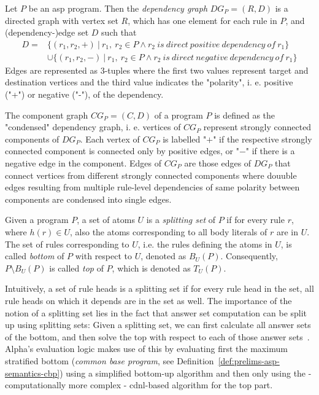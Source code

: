 \begin{definition}
\label{def:prelims-asp-semantics-depgraph}
Let $P$ be an \gls{asp} program. Then the \emph{dependency graph}  $\mathit{DG}_P = (R, D)$ is a directed graph with vertex set $R$, which has one element for each rule in $P$, and (dependency-)edge set $D$ such that
\begin{align*}
	D = &\{ (r_1, r_2, +)\ |\ r_1,\ r_2 \in P \land r_2\ \mathit{is\ direct\ positive\ dependency\ of}\ r_1 \}\\ &\cup
\{ (r_1, r_2, -)\ |\ r_1,\ r_2 \in P \land r_2\ \mathit{is\ direct\ negative\ dependency\ of}\ r_1 \}
\end{align*}
Edges are represented as 3-tuples where the first two values represent target and destination vertices and the third value indicates the "polarity", i. e. positive ("+") or negative ("-"), of the dependency.
\end{definition}

\begin{definition}
\label{def:prelims-asp-semantics-compgraph}
The component graph $\mathit{CG}_P = (C, D)$ of a program $P$ is defined as the "condensed" dependency graph, i. e. vertices of $\mathit{CG}_P$ represent strongly connected components of $\mathit{DG}_P$. Each vertex of $\mathit{CG}_P$ is labelled "$+$" if the respective strongly connected component is connected only by positive edges, or "$-$" if there is a negative edge in the component. Edges of $\mathit{CG}_P$ are those edges of $\mathit{DG}_P$ that connect vertices from different strongly connected components where douuble edges resulting from multiple rule-level dependencies of same polarity between components are condensed into single edges.
\end{definition}

\begin{definition}
\label{def:prelims-asp-semantics-splitting-set}
Given a program $P$, a set of atoms $U$ is a \emph{splitting set} of $P$ if for every rule $r$, where $h(r) \in U$, also the atoms corresponding to all body literals of $r$ are in $U$. The set of rules corresponding to $U$, i.e. the rules defining the atoms in $U$, is called \emph{bottom} of $P$ with respect to $U$, denoted as $B_U(P)$. Consequently, $P \setminus B_U(P)$ is called \emph{top} of $P$, which is denoted as $T_U(P)$.
\end{definition}

Intuitively, a set of rule heads is a splitting set if for every rule head in the set, all rule heads on which it depends are in the set as well. The importance of the notion of a splitting set lies in the fact that answer set computation can be split up using splitting sets: Given a splitting set, we can first calculate all answer sets of the bottom, and then solve the top with respect to each of those answer sets~\cite{splitting-sets}. Alpha's evaluation logic makes use of this by evaluating first the maximum stratified bottom (\emph{common base program}, see Definition~\ref{def:prelims-asp-semantics-cbp}) using a simplified bottom-up algorithm and then only using the - computationally more complex - \gls{cdnl}-based algorithm for the top part.

